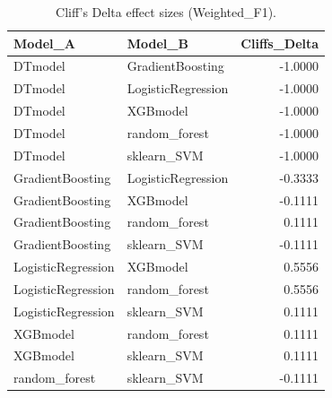 \begin{table}[t]
\centering
\begin{tabular}{llr}
\toprule
Model_A & Model_B & Cliffs_Delta \\
\midrule
DTmodel & GradientBoosting & -1.0000 \\
DTmodel & LogisticRegression & -1.0000 \\
DTmodel & XGBmodel & -1.0000 \\
DTmodel & random_forest & -1.0000 \\
DTmodel & sklearn_SVM & -1.0000 \\
GradientBoosting & LogisticRegression & -0.3333 \\
GradientBoosting & XGBmodel & -0.1111 \\
GradientBoosting & random_forest & 0.1111 \\
GradientBoosting & sklearn_SVM & -0.1111 \\
LogisticRegression & XGBmodel & 0.5556 \\
LogisticRegression & random_forest & 0.5556 \\
LogisticRegression & sklearn_SVM & 0.1111 \\
XGBmodel & random_forest & 0.1111 \\
XGBmodel & sklearn_SVM & 0.1111 \\
random_forest & sklearn_SVM & -0.1111 \\
\bottomrule
\end{tabular}
\caption{Cliff's Delta effect sizes (Weighted_F1).}
\label{tab:cliffs_Weighted_F1}
\end{table}